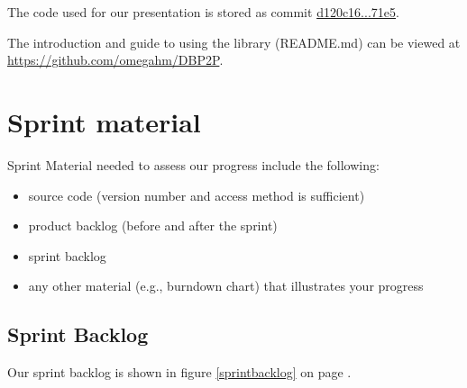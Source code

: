 \documentclass[a4paper,11pt]{article}
\begin{document}
The code used for our presentation is stored as commit \href{https://github.com/omegahm/DBP2P/commit/d120c1657b8c1582d8357cbba3efcc10332a71e5}{d120c16...71e5}.

The introduction and guide to using the library (README.md) can be viewed at \href{https://github.com/omegahm/DBP2P}{https://github.com/omegahm/DBP2P}.


\section{Sprint material}
Sprint Material needed to assess our progress include the following:
\begin{itemize}
\item source code (version number and access method is sufficient)
\item product backlog (before and after the sprint)
\item sprint backlog
\item any other material (e.g., burndown chart) that illustrates your progress
\end{itemize}

\subsection{Sprint Backlog}
Our sprint backlog is shown in figure \ref{sprintbacklog} on page \pageref{sprintbacklog}.
\end{document}
